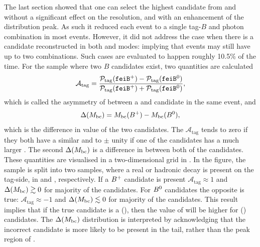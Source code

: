 The last section showed that one can select the highest \feiProb candidate from \feiBp and \feiBz without a significant effect on the \EB resolution, and with an enhancement of the \Mbc distribution peak.
As such it reduced each event to a single tag-$B$ and photon combination in most events.
However, it did not address the case when there is a candidate reconstructed in both \feiBp and \feiBz modes: implying that events may still have up to two combinations.
Such cases are evaluated to happen roughly 10.5\% of the time. 
For the sample where two $B$ candidates exist, two quantities are calculated
\begin{equation}\label{eq:asymmetry_tag}
    \mathcal{A}_{\mathrm{tag}} = \frac{\mathcal{P}_{\mathrm{tag}}({\texttt{feiB}^+}) - \mathcal{P}_{\mathrm{tag}}({\texttt{feiB}^0})}{\mathcal{P}_{\mathrm{tag}}({\texttt{feiB}^+}) + \mathcal{P}_{\mathrm{tag}}({\texttt{feiB}^0})},
\end{equation}
which is called the asymmetry of \feiProb between a \feiBp and \feiBz candidate in the same event, and
\begin{equation}\label{eq:delta_mbc}
    \Delta({M_{\mathrm{bc}}}) = {M_{\mathrm{bc}}}(B^+) - {M_{\mathrm{bc}}}(B^0),
\end{equation}
which is the difference in \Mbc value of the two candidates.
The $\mathcal{A}_{\mathrm{tag}}$ tends to zero if they both have a similar \feiProb and to $\pm$ unity if one of the candidates has a much larger \feiProb.
The second $\Delta({M_{\mathrm{bc}}})$ is a difference in \Mbc between both of the candidates.
These quantities are visualised in a two-dimensional grid in .
In the figure, the sample is split into two samples, where a real \Bp or \Bz hadronic decay is present on the tag-side, in  and , respectively.
If a $B^+$ candidate is present $\mathcal{A}_{\mathrm{tag}}\approx1$ and $\Delta({M_{\mathrm{bc}}})\gtrsim 0$ for majority of the candidates.
For $B^0$ candidates the opposite is true: $\mathcal{A}_{\mathrm{tag}}\approx-1$ and $\Delta({M_{\mathrm{bc}}})\lesssim 0$ for majority of the candidates.
This result implies that if the true candidate is a \Bp(\Bz), then the value of \feiProb will be higher for \feiBp (\feiBz) candidates.
The $\Delta({M_{\mathrm{bc}}})$ distribution is interpreted by acknowledging that the incorrect candidate is more likely to be present in the tail, rather than the peak region of \Mbc.

